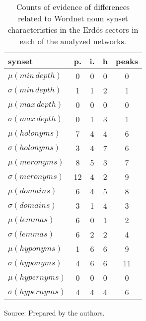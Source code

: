 \begin{table}[h!]
\begin{center}
\caption{Counts of evidence of differences related to Wordnet noun synset characteristics in the Erd\"os sectors in each of the analyzed networks.}
\begin{tabular}{| l || c | c | c || c |}\hline
{\bf synset} & {\bf p.} & {\bf i.} & {\bf h} & {\bf peaks} \\\hline\hline
$\mu(min\,depth)$ & 0  & 0  & 0  & 0 \\
$\sigma(min\,depth)$ & 1  & 1  & 2  & 1 \\\hline
$\mu(max\,depth)$ & 0  & 0  & 0  & 0 \\
$\sigma(max\,depth)$ & 0  & 1  & 3  & 1 \\\hline
$\mu(holonyms)$ & 7  & 4  & 4  & 6 \\
$\sigma(holonyms)$ & 3  & 4  & 7  & 6 \\\hline
$\mu(meronyms)$ & 8  & 5  & 3  & 7 \\
$\sigma(meronyms)$ & 12  & 4  & 2  & 9 \\\hline
$\mu(domains)$ & 6  & 4  & 5  & 8 \\
$\sigma(domains)$ & 3  & 1  & 4  & 3 \\\hline
$\mu(lemmas)$ & 6  & 0  & 1  & 2 \\
$\sigma(lemmas)$ & 6  & 2  & 2  & 4 \\\hline
$\mu(hyponyms)$ & 1  & 6  & 6  & 9 \\
$\sigma(hyponyms)$ & 4  & 6  & 6  & 11 \\\hline
$\mu(hypernyms)$ & 0  & 0  & 0  & 0 \\
$\sigma(hypernyms)$ & 4  & 4  & 4  & 6 \\\hline
\end{tabular}
\begin{flushleft}
		Source: Prepared by the authors.\
\end{flushleft}
\end{center}
\end{table}

